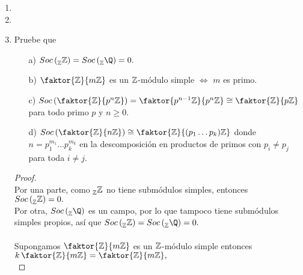 \documentclass{article}
\begin{document}
\begin{enumerate}[label=\textbf{Ej \arabic*.}]
\item
\item
\item Pruebe que 
\begin{itemize}
\item[a)] $Soc\left(\prescript{}{\Z}{\Z}\right)=Soc\left(\prescript{}{\Z}{\Q}\right)=0.$
\item[b)] $\faktor{\Z}{m\Z}$ es un $\mathbb{Z}$-módulo simple $\iff$ $m$ es primo.
\item[c)] $Soc\left(\faktor{\Z}{p^n\Z}\right)=\faktor{p^{n-1}\Z}{p^n\Z}\cong \faktor{\Z}{p\Z}$ para todo primo $p$ y $n\geq 0$.
\item[d)] $Soc\left(\faktor{\Z}{n\Z}\right)\cong \faktor{\Z}{(p_1\ldots p_k)\Z}$ donde $n=p_1^{m_1}\ldots p_k^{m_k}$ en la descomposición
en productos de primos con $p_i\neq p_j$ para toda $i\neq j$.
\end{itemize}
\begin{proof}\\
Por una parte, como $\prescript{}{\mathbb{Z}}{\mathbb{Z}}$ no tiene submódulos simples, entonces\\ $Soc\left(\prescript{}{\mathbb{Z}}{\mathbb{Z}}\right)=0.$\\
Por otra, $Soc\left(\prescript{}{\Z}{\Q}\right)$ es un campo, por lo que tampoco tiene submódulos simples propios, así que 
 $Soc\left(\prescript{}{\Z}{\Z}\right)=Soc\left(\prescript{}{\Z}{\Q}\right)=0.$\\
\\
Supongamos $\faktor{\Z}{m\Z}$ es un $\mathbb{Z}$-módulo simple entonces $k\,\faktor{\Z}{m\Z}=\faktor{\Z}{m\Z},$\\


\end{proof}
\end{enumerate}
\end{document}
